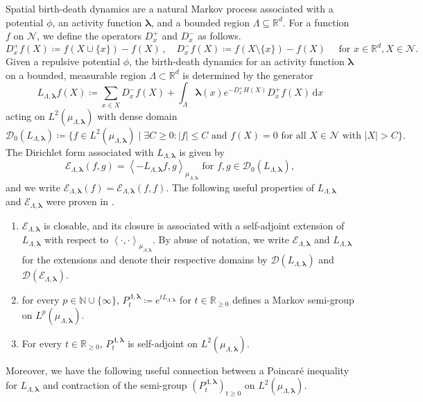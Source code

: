 \documentclass[10pt]{amsart}
\theoremstyle{definition}
\theoremstyle{remark}
\newcommand{\pointsets}{\mathcal{N}}
\newcommand{\dirichlet}{\mathcal{E}}
\newcommand{\innerProduct}[2]{\left\langle #1, #2 \right\rangle}
\newcommand{\N}{\mathbb{N}}
\newcommand{\R}{\mathbb{R}}
\newcommand{\region}{\Lambda}
\newcommand{\potential}{\phi}
\newcommand{\activities}{\pmb{\lambda}}
\newcommand{\size}[1]{\left\lvert#1\right\rvert}
\newcommand{\diff}{\mathrm{d}}
\newcommand{\domain}{\mathcal{D}}
\newcommand{\absolute}[1]{\left\lvert#1\right\rvert}
\begin{document}
	
	Spatial birth-death dynamics are a natural Markov process associated with a potential $\potential$, an activity function $\activities$, and a bounded region $\region \subseteq \R^d$.
	For a function $f$ on $\pointsets$, we define the operators $D_x^+$ and $D_x^-$ as follows.
	\[
	D_x^{+} f (X) \coloneqq f(X \cup \{x\}) - f(X) \,,\hspace{1em} D_x^{-} f (X) \coloneqq f(X \setminus \{x\}) - f(X) \hspace{1em}\text{ for } x \in \R^d, X \in \pointsets.
	\]
	Given a repulsive potential $\potential$, the birth-death dynamics for an activity function $\activities$ on a bounded, measurable region $\region \subset \R^d$ is determined by the generator
	\begin{equation}\label{eq:generator-definition}
		L_{\region, \activities} f (X) \coloneqq \sum_{x \in X} D_x^- f (X) + \int_{\region} \activities(x)  e^{-D_x^+ H(X)} D_x^+ f (X)\, \diff x
	\end{equation}
	acting on $L^2(\mu_{\region, \activities})$ with dense domain
	\[
	\domain_0(L_{\region, \activities}) \coloneqq \{f \in L^2(\mu_{\region, \activities}) \mid \exists C \ge 0: \absolute{f} \le C \text{ and } f(X) = 0 \text{ for all } X \in \pointsets \text{ with } \size{X} > C\}.
	\]
	The Dirichlet form associated with $L_{\region, \activities}$ is given by
	\begin{equation}\label{eq:dirichlet-def}
		\dirichlet_{\region, \activities}(f, g) = \innerProduct{- L_{\region, \activities} f}{g}_{\mu_{\region, \activities}} \text{ for } f, g \in \domain_0(L_{\region, \activities}),
	\end{equation}
	and we write $\dirichlet_{\region, \activities}(f) = \dirichlet_{\region, \activities}(f, f)$.
	The following useful properties of $L_{\region, \activities}$ and $\dirichlet_{\region, \activities}$ were proven in \cite[Proposition 2.1]{bertini2002spectral}.
	\begin{enumerate}[(1)]
		\item $\dirichlet_{\region, \activities}$ is closable, and its closure is associated with a self-adjoint extension of $L_{\region, \activities}$ with respect to $\innerProduct{\cdot}{\cdot}_{\mu_{\region, \activities}}$.
		By abuse of notation, we write $\dirichlet_{\region, \activities}$ and $L_{\region, \activities}$ for the extensions and denote their respective domains by $\domain(L_{\region, \activities})$ and $\domain(\dirichlet_{\region, \activities})$.
		\item for every $p \in \N \cup \{\infty\}$, $P_t^{\region, \activities} \coloneqq e^{t L_{\region, \activities}}$ for $t \in \R_{\ge 0}$ defines a Markov semi-group on $L^p(\mu_{\region, \activities})$. 
		\item For every $t \in \R_{\ge 0}$, $P_t^{\region, \activities}$ is self-adjoint on $L^2(\mu_{\region, \activities})$.
	\end{enumerate}
	Moreover, we have the following useful connection between a Poincaré inequality for $L_{\region, \activities}$ and contraction of the semi-group $(P_t^{\region, \activities})_{t \ge 0}$ on $L^2(\mu_{\region, \activities})$.
	
\end{document}
